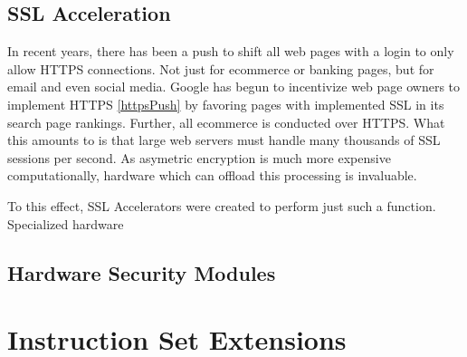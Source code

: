 \documentclass[journal]{IEEEtran}
\begin{document}
\subsection{SSL Acceleration}

In recent years, there has been a push to shift all web pages with a login to only allow HTTPS connections.  Not just for ecommerce or banking pages, but for email and even social media.  Google has begun to incentivize web page owners to implement HTTPS \ref{httpsPush} by favoring pages with implemented SSL in its search page rankings.  Further, all ecommerce is conducted over HTTPS.  What this amounts to is that large web servers must handle many thousands of SSL sessions per second.  As asymetric encryption is much more expensive computationally, hardware which can offload this processing is invaluable.

To this effect, SSL Accelerators were created to perform just such a function.  Specialized hardware 

\subsection{Hardware Security Modules}

\section{Instruction Set Extensions}


%
%
\end{document}
